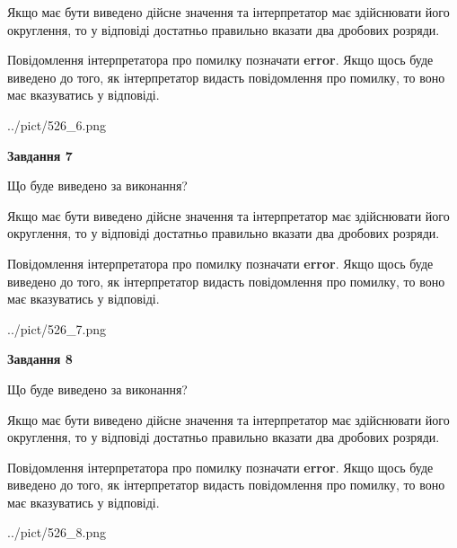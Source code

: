 \documentclass[12pt, ukrainian]{article}
\begin{document}
{\begin {Large}
Якщо має бути виведено дійсне значення та інтерпретатор має здійснювати його округлення, 
то у відповіді достатньо правильно вказати два дробових розряди.

Повідомлення інтерпретатора про помилку позначати \textbf{error}.
Якщо щось буде виведено до того, як інтерпретатор видасть повідомлення про помилку, 
то воно має вказуватись у відповіді. \par

\begin{center}
	{../pict/526_6.png}
\end{center}
\newpage

{\begin {center}\textbf{Завдання 7}\end {center}}\par
Що буде виведено за виконання? \par

Якщо має бути виведено дійсне значення та інтерпретатор має здійснювати його округлення, 
то у відповіді достатньо правильно вказати два дробових розряди.

Повідомлення інтерпретатора про помилку позначати \textbf{error}.
Якщо щось буде виведено до того, як інтерпретатор видасть повідомлення про помилку, 
то воно має вказуватись у відповіді. \par

\begin{center}
	{../pict/526_7.png}
\end{center}
\newpage

{\begin {center}\textbf{Завдання 8}\end {center}}\par
Що буде виведено за виконання? \par

Якщо має бути виведено дійсне значення та інтерпретатор має здійснювати його округлення, 
то у відповіді достатньо правильно вказати два дробових розряди.

Повідомлення інтерпретатора про помилку позначати \textbf{error}.
Якщо щось буде виведено до того, як інтерпретатор видасть повідомлення про помилку, 
то воно має вказуватись у відповіді. \par

\begin{center}
	{../pict/526_8.png}
\end{center}
\newpage


\end{Large}}
\end{document}
